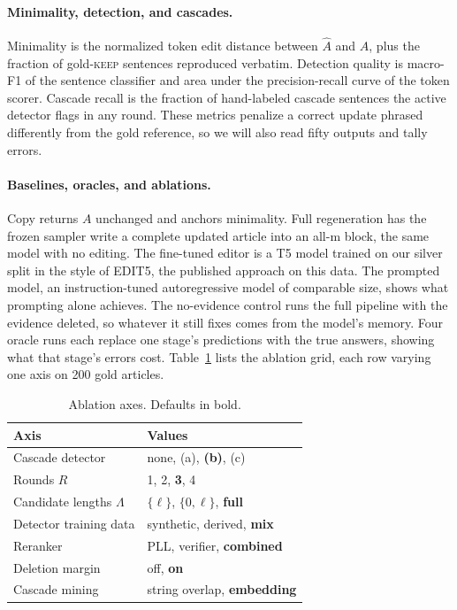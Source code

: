 \documentclass[11pt]{article}
\newcommand{\mask}{\ensuremath{\mathrm{m}}}
\newcommand{\keep}{\textsc{keep}}
\begin{document}
\paragraph{Minimality, detection, and cascades.}
Minimality is the normalized token edit distance between $\hat{A}$ and $A$, plus the fraction of gold-\keep{} sentences reproduced verbatim. Detection quality is macro-F1 of the sentence classifier and area under the precision-recall curve of the token scorer. Cascade recall is the fraction of hand-labeled cascade sentences the active detector flags in any round. These metrics penalize a correct update phrased differently from the gold reference, so we will also read fifty outputs and tally errors.

\paragraph{Baselines, oracles, and ablations.}
Copy returns $A$ unchanged and anchors minimality. Full regeneration has the frozen sampler write a complete updated article into an all-\mask{} block, the same model with no editing. The fine-tuned editor is a T5 model trained on our silver split in the style of EDIT5, the published approach on this data. The prompted model, an instruction-tuned autoregressive model of comparable size, shows what prompting alone achieves. The no-evidence control runs the full pipeline with the evidence deleted, so whatever it still fixes comes from the model's memory. Four oracle runs each replace one stage's predictions with the true answers, showing what that stage's errors cost. Table~\ref{tab:ablations} lists the ablation grid, each row varying one axis on 200 gold articles.

\begin{table}[t]
\caption{Ablation axes. Defaults in bold.}
\label{tab:ablations}
\centering
\small
\begin{tabular}{ll}
\toprule
Axis & Values \\
\midrule
Cascade detector & none, (a), \textbf{(b)}, (c) \\
Rounds $R$ & 1, 2, \textbf{3}, 4 \\
Candidate lengths $\Lambda$ & $\{\ell\}$, $\{0, \ell\}$, \textbf{full} \\
Detector training data & synthetic, derived, \textbf{mix} \\
Reranker & PLL, verifier, \textbf{combined} \\
Deletion margin & off, \textbf{on} \\
Cascade mining & string overlap, \textbf{embedding} \\
\bottomrule
\end{tabular}
\end{table}
\end{document}
